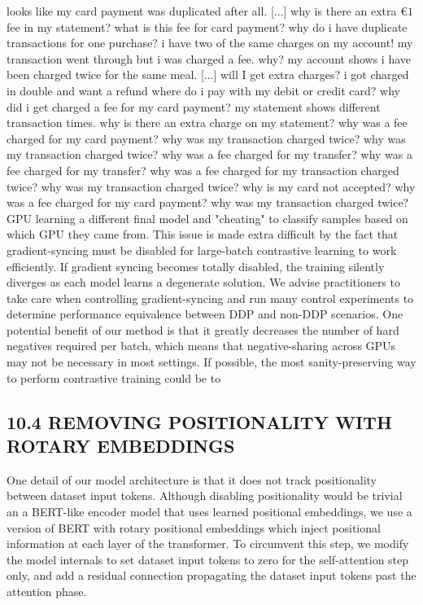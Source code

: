 looks like my card payment was duplicated after all. [...]
why is there an extra \(€ 1\) fee in my statement? what is this fee for card payment?
why do i have duplicate transactions for one purchase?
i have two of the same charges on my account!
my transaction went through but i was charged a fee. why?
my account shows i have been charged twice for the same meal. [...]
will I get extra charges?
i got charged in double and want a refund
where do i pay with my debit or credit card?
why did i get charged a fee for my card payment? my statement shows different transaction times. why is there an extra charge on my statement? why was a fee charged for my card payment? why was my transaction charged twice?
why was my transaction charged twice?
why was a fee charged for my transfer?
why was a fee charged for my transfer?
why was a fee charged for my transaction charged twice?
why was my transaction charged twice?
why is my card not accepted?
why was a fee charged for my card payment?
why was my transaction charged twice?
GPU learning a different final model and "cheating" to classify samples based on which GPU they came from.
This issue is made extra difficult by the fact that gradient-syncing must be disabled for large-batch contrastive learning to work efficiently. If gradient syncing becomes totally disabled, the training silently diverges as each model learns a degenerate solution. We advise practitioners to take care when controlling gradient-syncing and run many control experiments to determine performance equivalence between DDP and non-DDP scenarios.
One potential benefit of our method is that it greatly decreases the number of hard negatives required per batch, which means that negative-sharing across GPUs may not be necessary in most settings. If possible, the most sanity-preserving way to perform contrastive training could be to
\subsection*{10.4 REMOVING POSITIONALITY WITH ROTARY EMBEDDINGS}
One detail of our model architecture is that it does not track positionality between dataset input tokens. Although disabling positionality would be trivial an a BERT-like encoder model that uses learned positional embeddings, we use a version of BERT with rotary positional embeddings which inject positional information at each layer of the transformer. To circumvent this step, we modify the model internals to set dataset input tokens to zero for the self-attention step only, and add a residual connection propagating the dataset input tokens past the attention phase.
